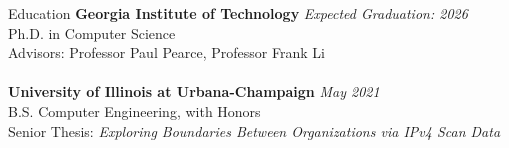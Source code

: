 \documentclass{resume} %
\begin{document}
	
	
	\begin{rSection}{Education}
		{\bf Georgia Institute of Technology} \hfill {\em Expected Graduation: 2026} 
		\\ Ph.D. in Computer Science\hfill \\
		Advisors: Professor Paul Pearce, Professor Frank Li\\
		\\
		{\bf University of Illinois at Urbana-Champaign} \hfill {\em May 2021} 
		\\ B.S. Computer Engineering, with Honors\hfill %
		\\ Senior Thesis: \textit{Exploring Boundaries Between Organizations via IPv4 Scan Data}
	\end{rSection} 
	
\end{document}

